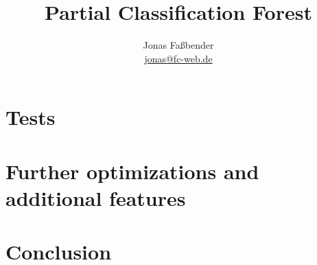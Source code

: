 \documentclass[journal]{IEEEtran}
\title{Partial Classification Forest}
\author{Jonas Fa{\ss}bender \\ [1ex]
  \href{mailto: jonas@fc-web.de}{jonas@fc-web.de}}
\date{}
\begin{document}
\maketitle

\begin{abstract}
\end{abstract}







\section{Tests}
\label{sec:tests}

\section{Further optimizations and additional features}
\label{sec:oandf}

\section{Conclusion}
\label{sec:conclusion}


\end{document}
